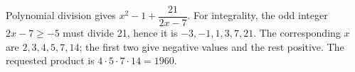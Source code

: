 Polynomial division gives $x^2-1+\dfrac{21}{2x-7}$. For integrality, the odd integer $2x-7\ge-5$ must divide 21, hence it is $-3,-1,1,3,7,21$. The corresponding $x$ are $2,3,4,5,7,14$; the first two give negative values and the rest positive. The requested product is $4\cdot5\cdot7\cdot14=\boxed{1960}$.

